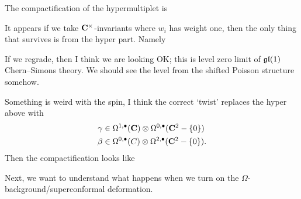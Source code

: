 \documentclass[11pt]{amsart}
\begin{document}
The compactification of the hypermultiplet is
\beqn
{}
\eeqn

It appears if we take $\mathbf{C}^\times$-invariants where $w_i$ has weight one, then the only thing that survives is from the hyper part. 
Namely
\beqn
{}
\eeqn
If we regrade, then I think we are looking OK; this is level zero limit of $\mathfrak{gl}(1)$ Chern--Simons theory.
We should see the level from the shifted Poisson structure somehow.

Something is weird with the spin, I think the correct `twist' replaces the hyper above with 
\begin{align*}
\gamma & \in \Omega^{1,\bullet}(\mathbf{C}) \otimes \Omega^{0,\bullet}(\mathbf{C}^2 - \{0\}) \\
\beta & \in \Omega^{0,\bullet}(C) \otimes \Omega^{2,\bullet}(\mathbf{C}^2 - \{0\}) .
\end{align*}
Then the compactification looks like
\beqn
{}
\eeqn

Next, we want to understand what happens when we turn on the $\Omega$-background/superconformal deformation.
\end{document}
